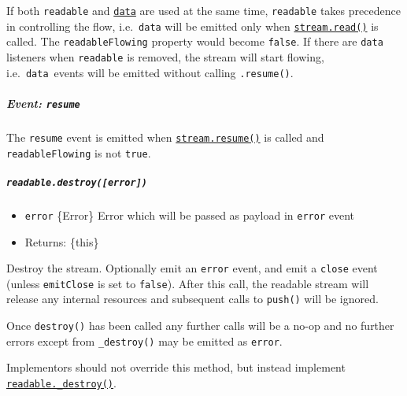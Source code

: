 If both \texttt{\textquotesingle{}readable\textquotesingle{}} and
\hyperref[event-data]{\texttt{\textquotesingle{}data\textquotesingle{}}}
are used at the same time,
\texttt{\textquotesingle{}readable\textquotesingle{}} takes precedence
in controlling the flow,
i.e.~\texttt{\textquotesingle{}data\textquotesingle{}} will be emitted
only when \hyperref[readablereadsize]{\texttt{stream.read()}} is called.
The \texttt{readableFlowing} property would become \texttt{false}. If
there are \texttt{\textquotesingle{}data\textquotesingle{}} listeners
when \texttt{\textquotesingle{}readable\textquotesingle{}} is removed,
the stream will start flowing,
i.e.~\texttt{\textquotesingle{}data\textquotesingle{}}~events will be
emitted without calling \texttt{.resume()}.

\subparagraph{\texorpdfstring{Event:
\texttt{\textquotesingle{}resume\textquotesingle{}}}{Event: \textquotesingle resume\textquotesingle{}}}\label{event-resume}

The \texttt{\textquotesingle{}resume\textquotesingle{}} event is emitted
when \hyperref[readableresume]{\texttt{stream.resume()}} is called and
\texttt{readableFlowing} is not \texttt{true}.

\subparagraph{\texorpdfstring{\texttt{readable.destroy({[}error{]})}}{readable.destroy({[}error{]})}}\label{readable.destroyerror}

\begin{itemize}
\tightlist
\item
  \texttt{error} \{Error\} Error which will be passed as payload in
  \texttt{\textquotesingle{}error\textquotesingle{}} event
\item
  Returns: \{this\}
\end{itemize}

Destroy the stream. Optionally emit an
\texttt{\textquotesingle{}error\textquotesingle{}} event, and emit a
\texttt{\textquotesingle{}close\textquotesingle{}} event (unless
\texttt{emitClose} is set to \texttt{false}). After this call, the
readable stream will release any internal resources and subsequent calls
to \texttt{push()} will be ignored.

Once \texttt{destroy()} has been called any further calls will be a
no-op and no further errors except from \texttt{\_destroy()} may be
emitted as \texttt{\textquotesingle{}error\textquotesingle{}}.

Implementors should not override this method, but instead implement
\hyperref[readable_destroyerr-callback]{\texttt{readable.\_destroy()}}.

